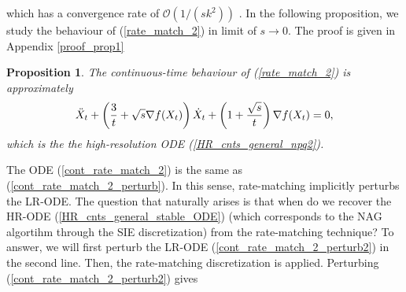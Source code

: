 \documentclass{article}
\theoremstyle{plain}
\newtheorem{proposition}[theorem]{Proposition}
\theoremstyle{definition}
\theoremstyle{remark}
\begin{document}
which has a convergence rate of \(\mathcal{O}(1/(s k^2))\) \citep{WibisonoE7351}. 
  In the following proposition, we study the behaviour of (\ref{rate_match_2}) in limit of \(s \rightarrow 0\). The proof is given in Appendix \ref{proof_prop1}
\begin{proposition}\label{prop1}
The continuous-time behaviour of (\ref{rate_match_2}) is approximately
\begin{align}\label{cont_rate_match_2}
    \Ddot{X}_t+\left(\frac{3}{t}+\sqrt{s}\nabla f(X_t)\right)\dot X_t+\left(1+\frac{\sqrt{s}}{t}\right)\nabla f(X_t)=0,
\end{align}
which is the the high-resolution ODE (\ref{HR_cnts_general_npq2}).
\end{proposition}
The ODE (\ref{cont_rate_match_2}) is the same as (\ref{cont_rate_match_2_perturb}).
In this sense, rate-matching implicitly perturbs the LR-ODE. The question that naturally arises is that when do we recover the HR-ODE (\ref{HR_cnts_general_stable_ODE}) (which corresponds to the NAG algortihm through the SIE discretization) from the rate-matching technique? To answer, we will first perturb the LR-ODE (\ref{cont_rate_match_2_perturb2}) in the second line. Then, the rate-matching discretization is applied. Perturbing (\ref{cont_rate_match_2_perturb2}) gives
\end{document}
